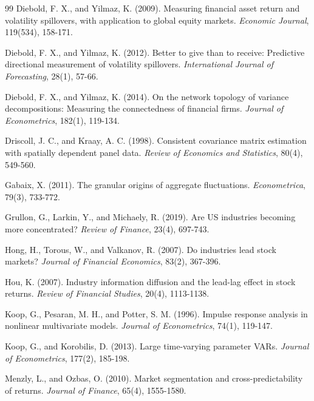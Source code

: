 \documentclass[11pt]{article}
\begin{document}
\begin{thebibliography}{99}
Diebold, F. X., and Yilmaz, K. (2009). Measuring financial asset return and volatility spillovers, with application to global equity markets. \textit{Economic Journal}, 119(534), 158-171.

Diebold, F. X., and Yilmaz, K. (2012). Better to give than to receive: Predictive directional measurement of volatility spillovers. \textit{International Journal of Forecasting}, 28(1), 57-66.

Diebold, F. X., and Yilmaz, K. (2014). On the network topology of variance decompositions: Measuring the connectedness of financial firms. \textit{Journal of Econometrics}, 182(1), 119-134.

Driscoll, J. C., and Kraay, A. C. (1998). Consistent covariance matrix estimation with spatially dependent panel data. \textit{Review of Economics and Statistics}, 80(4), 549-560.

Gabaix, X. (2011). The granular origins of aggregate fluctuations. \textit{Econometrica}, 79(3), 733-772.

Grullon, G., Larkin, Y., and Michaely, R. (2019). Are US industries becoming more concentrated? \textit{Review of Finance}, 23(4), 697-743.

Hong, H., Torous, W., and Valkanov, R. (2007). Do industries lead stock markets? \textit{Journal of Financial Economics}, 83(2), 367-396.

Hou, K. (2007). Industry information diffusion and the lead-lag effect in stock returns. \textit{Review of Financial Studies}, 20(4), 1113-1138.

Koop, G., Pesaran, M. H., and Potter, S. M. (1996). Impulse response analysis in nonlinear multivariate models. \textit{Journal of Econometrics}, 74(1), 119-147.

Koop, G., and Korobilis, D. (2013). Large time-varying parameter VARs. \textit{Journal of Econometrics}, 177(2), 185-198.

Menzly, L., and Ozbas, O. (2010). Market segmentation and cross-predictability of returns. \textit{Journal of Finance}, 65(4), 1555-1580.


\end{thebibliography}
\end{document}
